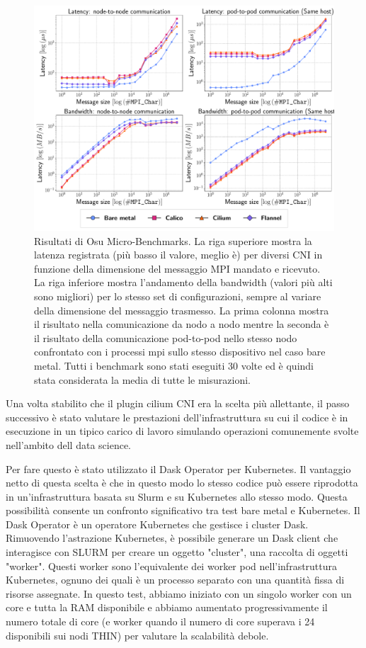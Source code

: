 \begin{figure}
  \centering
  \includegraphics[width=\textwidth]{img/abstract/summary-osu}
  \caption{Risultati di Osu Micro-Benchmarks. La riga superiore mostra la
    latenza registrata (più basso il valore, meglio è) per diversi CNI in
    funzione della dimensione del messaggio MPI mandato e ricevuto.
    La riga inferiore mostra l'andamento della bandwidth (valori più alti sono
    migliori) per lo stesso set di configurazioni, sempre al variare della
    dimensione del messaggio trasmesso.
    La prima colonna mostra il risultato nella comunicazione da nodo a nodo
    mentre la seconda è il risultato della comunicazione pod-to-pod nello stesso
    nodo confrontato con i processi mpi sullo stesso dispositivo nel caso bare metal.
    Tutti i benchmark sono stati eseguiti 30 volte ed è quindi stata considerata
    la media di tutte le misurazioni.}
    \label{fig:summary-osu_it}
\end{figure}

Una volta stabilito che il plugin cilium CNI era la scelta più allettante,
il passo successivo è stato valutare le prestazioni dell'infrastruttura su cui il
codice è in esecuzione in un tipico carico di lavoro simulando operazioni
comunemente svolte nell'ambito dell data science.

Per fare questo è stato utilizzato il Dask Operator per Kubernetes.
Il vantaggio netto di questa scelta è che in questo modo lo stesso codice può
essere riprodotta in un'infrastruttura basata su Slurm e su Kubernetes allo
stesso modo.
Questa possibilità consente un confronto significativo tra test bare metal e
Kubernetes.
Il Dask Operator è un operatore Kubernetes che gestisce i cluster Dask.
Rimuovendo l'astrazione Kubernetes, è possibile generare un Dask client che
interagisce con SLURM per creare un oggetto "cluster", una raccolta di oggetti "worker".
Questi worker sono l'equivalente dei worker pod nell'infrastruttura Kubernetes,
ognuno dei quali è un processo separato con una quantità fissa di risorse assegnate.
In questo test, abbiamo iniziato con un singolo worker con un core e tutta la
RAM disponibile e abbiamo aumentato progressivamente il numero totale di core (e
worker quando il numero di core superava i 24 disponibili sui nodi THIN) per
valutare la scalabilità debole.


